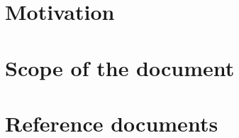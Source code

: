 

\section{Motivation}

\section{Scope of the document}

 \section{Reference documents}
\begingroup
\renewcommand{\chapter}[2]{}%
  
  
\endgroup
